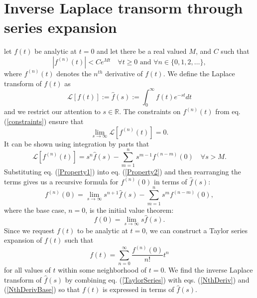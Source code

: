 \documentclass[extra,mreferee]{gji}
\begin{document}
\appendix
\section{Inverse Laplace transorm through series expansion}
let $f(t)$ be analytic at $t=0$ and let there
  be a real valued $M$, and $C$ such that
\begin{equation}\label{constraints}
  \left|f^{(n)}(t)\right| < Ce^{Mt}\quad \forall t\geq 0\text{ and }\forall n\in\{0,1,2,\dots\},
\end{equation}
where $f^{(n)}(t)$ denotes the $n^{th}$ derivative of $f(t)$.  We
define the Laplace transform of $f(t)$ as
\begin{equation}
  \mathcal{L}[f(t)] := \hat{f}(s) := \int_{0}^\infty f(t)e^{-st}dt
\end{equation}
and we restrict our attention to $s\in\mathbb{R}$.  The constraints on
$f^{(n)}(t)$ from eq. (\ref{constraints}) ensure that
\begin{equation}\label{Property2}
  \lim_{s \to \infty}\mathcal{L}[f^{(n)}(t)] = 0.
\end{equation}
It can be shown using integration by parts that
\begin{equation}\label{Property1}
  \mathcal{L}[f^{(n)}(t)] = s^n\hat{f}(s) - \sum_{m=1}^ns^{m-1}f^{(n-m)}(0)
  \quad \forall s>M.
\end{equation}
Substituting eq. (\ref{Property1}) into eq. (\ref{Property2}) and then
rearranging the terms gives us a recursive formula for $f^{(n)}(0)$ in
terms of $\hat{f}(s)$:
\begin{equation}\label{NthDeriv}
  f^{(n)}(0) = \lim_{s \to \infty} s^{n + 1}\hat{f}(s) -
               \sum_{m=1}^{n} s^{m}f^{(n-m)}(0),
\end{equation}
where the base case, $n=0$, is the initial value theorem:
\begin{equation}\label{NthDerivBase}
  f(0) = \lim_{s \to \infty} s\hat{f}(s).
\end{equation}
Since we request $f(t)$ to be analytic at $t=0$, we can construct a
Taylor series expansion of $f(t)$ such that
\begin{equation}\label{TaylorSeries}
  f(t) = \sum_{n=0}^\infty\frac{f^{(n)}(0)}{n!}t^n
\end{equation}
for all values of $t$ within some neighborhood of $t=0$. We find the
inverse Laplace transform of $\hat{f}(s)$ by combining
eq. (\ref{TaylorSeries}) with eqs. (\ref{NthDeriv}) and
(\ref{NthDerivBase}) so that $f(t)$ is expressed in terms of
$\hat{f}(s)$.
\end{document}
